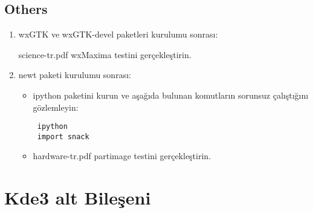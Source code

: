 \documentclass[a4paper,10pt]{article}
\begin{document}
\subsection*{Others}
\begin{enumerate}
\item wxGTK ve wxGTK-devel paketleri kurulumu sonrası:

science-tr.pdf wxMaxima testini gerçekleştirin.

 \item newt paketi kurulumu sonrası:
\begin{itemize}
 \item ipython paketini kurun ve aşağıda bulunan komutların sorunsuz çalıştığını gözlemleyin:
\begin{verbatim}
 ipython
 import snack
\end{verbatim}
  \item hardware-tr.pdf partimage testini gerçekleştirin.

\end{itemize}
 


\end{enumerate}

\section{Kde3 alt Bileşeni}
\end{document}
